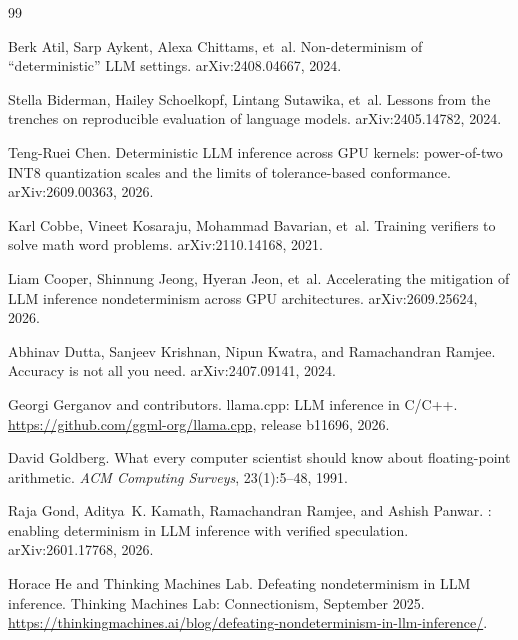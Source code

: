 \begin{thebibliography}{99}\small

Berk Atil, Sarp Aykent, Alexa Chittams, et~al.
\newblock Non-determinism of ``deterministic'' {LLM} settings.
\newblock arXiv:2408.04667, 2024.

Stella Biderman, Hailey Schoelkopf, Lintang Sutawika, et~al.
\newblock Lessons from the trenches on reproducible evaluation of language models.
\newblock arXiv:2405.14782, 2024.

Teng-Ruei Chen.
\newblock Deterministic {LLM} inference across {GPU} kernels: power-of-two {INT8} quantization
  scales and the limits of tolerance-based conformance.
\newblock arXiv:2609.00363, 2026.

Karl Cobbe, Vineet Kosaraju, Mohammad Bavarian, et~al.
\newblock Training verifiers to solve math word problems.
\newblock arXiv:2110.14168, 2021.

Liam Cooper, Shinnung Jeong, Hyeran Jeon, et~al.
\newblock Accelerating the mitigation of {LLM} inference nondeterminism across {GPU}
  architectures.
\newblock arXiv:2609.25624, 2026.

Abhinav Dutta, Sanjeev Krishnan, Nipun Kwatra, and Ramachandran Ramjee.
\newblock Accuracy is not all you need.
\newblock arXiv:2407.09141, 2024.

Georgi Gerganov and contributors.
\newblock llama.cpp: {LLM} inference in {C/C++}.
\newblock \url{https://github.com/ggml-org/llama.cpp}, release b11696, 2026.

David Goldberg.
\newblock What every computer scientist should know about floating-point arithmetic.
\newblock \emph{ACM Computing Surveys}, 23(1):5--48, 1991.

Raja Gond, Aditya~K. Kamath, Ramachandran Ramjee, and Ashish Panwar.
: enabling determinism in {LLM} inference with verified speculation.
\newblock arXiv:2601.17768, 2026.

Horace He and Thinking Machines Lab.
\newblock Defeating nondeterminism in {LLM} inference.
\newblock Thinking Machines Lab: Connectionism, September 2025.
\newblock \url{https://thinkingmachines.ai/blog/defeating-nondeterminism-in-llm-inference/}.


\end{thebibliography}
